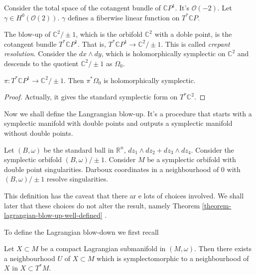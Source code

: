 \medskip\noindent


Consider the total space of the cotangent
bundle of $\mathbb{C}P^1$.
It's $\mathcal{O}(-2)$.
Let $\gamma \in H^{0}(\mathcal{O}(2))$.
$\gamma$ defines a fiberwise linear function
on $T^*\mathbb{C}P$.

The blow-up of $\mathbb{C}^2/\pm 1$, which is
the orbifold $\mathbb{C}^2$ with
 a doble point, is the cotangent bundle $T^*
 \mathbb{C}P^1$.
That is,
$T^*\mathbb{C}P^1 \to \mathbb{C}^2/\pm 1$.
This is called {\it crepant resolution}.
Consider the $dx \wedge dy$, which is
holomorphically symplectic
on $\mathbb{C}^2$ and descends to the
quotient $\mathbb{C}^2/\pm 1$
as $\Omega_0$.

\begin{proposition}
\label{proposition-}
$\pi:T^*\mathbb{C}P^1 \to \mathbb{C}^2/\pm
1$.
Then $\pi^*\Omega_0$ is holomorphically
symplectic.
\end{proposition}

\begin{proof}
Actually, it gives the standard symplectic
form on $T^*\mathbb{C}^2$.
\end{proof}

\medskip\noindent
Now we shall define the Langrangian blow-up.
It's a procedure that starts with a
symplectic manifold
with double points and outputs a symplectic
manifold
without double points.

\begin{definition}
\label{definition-lagrangian-blow-up}
Let $(B,\omega)$ be the standard ball in
$\mathbb{R}^n$,
$dz_1 \wedge dz_2 +dz_3 \wedge dz_4$.
Consider the symplectic orbifold
$(B,\omega)/\pm 1$.
Consider $M$ be a symplectic orbifold
with double point singularities.
Darboux coordinates in a neighbourhood of $0$
with $(B,\omega)/\pm 1$ resolve
singularities.
\end{definition}

This definition has the caveat that there ar
e lots of choices involved.
We shall later that these choices do not
alter the result,
namely Theorem
\ref{theorem-lagrangian-blow-up-well-defined}
.

To define the Lagrangian blow-down we first
recall

\begin{theorem}
\label{theorem-weins-lagra-neigh}
Let $X \subset M$ be a compact Lagrangian
submanifold in $(M,\omega)$.
Then there exists a neighbourhood $U$ of $X
\subset M$
which is symplectomorphic to a neighbourhood
of $X$
in $X \subset T^*M$.
\end{theorem}

